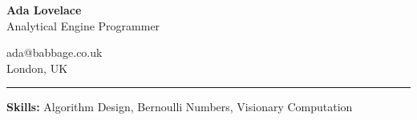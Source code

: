 \documentclass{article}
\begin{document}
\noindent\begin{minipage}{0.5\textwidth}
\textbf{Ada Lovelace} \\
Analytical Engine Programmer
\end{minipage}%
\begin{minipage}{0.5\textwidth}
\raggedleft
ada@babbage.co.uk \\
London, UK
\end{minipage}
\vspace{5mm}
\hrule
\vspace{2mm}
\textbf{Skills:} Algorithm Design, Bernoulli Numbers, Visionary Computation
\end{document}
